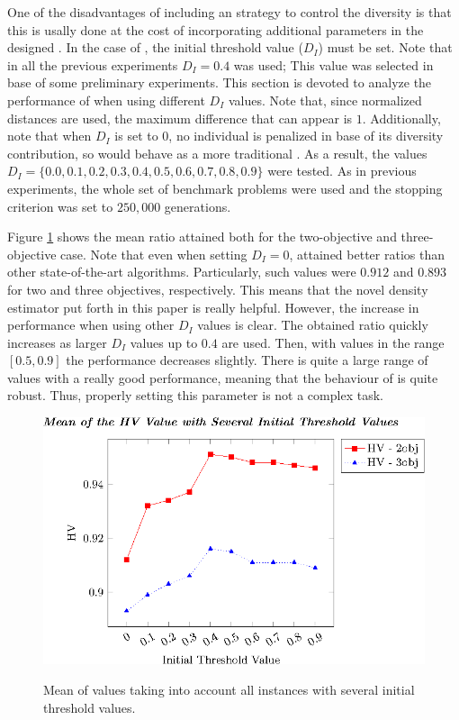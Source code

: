 One of the disadvantages of including an strategy to control the diversity is that this is usally done at the cost of
incorporating additional parameters in the designed \EA{}.
%
In the case of \VSDMOEA{}, the initial threshold value ($D_I$) must be set.
%
Note that in all the previous experiments $D_I = 0.4$ was used;
%
This value was selected in base of some preliminary experiments.
%
This section is devoted to analyze the performance of \VSDMOEA{} when using different $D_I$ values.
%
Note that, since normalized distances are used, the maximum difference that can appear is $1$.
%
Additionally, note that when $D_I$ is set to 0, no individual is penalized in base of its diversity contribution,
so \VSDMOEA{} would behave as a more traditional \MOEA{}.
%
As a result, the values $D_I = \{0.0, 0.1, 0.2, 0.3, 0.4, 0.5, 0.6, 0.7, 0.8, 0.9\}$ were tested.
%
As in previous experiments, the whole set of benchmark problems were used and
the stopping criterion was set to $250,000$ generations.

Figure \ref{fig:Initial-distance-factor} shows the mean \HV{} ratio attained both for the two-objective and three-objective case.
%
Note that even when setting $D_I = 0$, \VSDMOEA{} attained better \HV{} ratios than other state-of-the-art algorithms.
%
Particularly, such values were $0.912$ and $0.893$ for two and three objectives, respectively.
%
This means that the novel density estimator put forth in this paper is really helpful.
%
However, the increase in performance when using other $D_I$ values is clear.
%
The obtained \HV{} ratio quickly increases as larger $D_I$ values up to $0.4$ are used.
%
Then, with values in the range $[0.5, 0.9]$ the performance decreases slightly.
%
There is quite a large range of values with a really good performance, meaning that 
the behaviour of \VSDMOEA{} is quite robust.
%
Thus, properly setting this parameter is not a complex task.
%

\begin{figure}[t]
\centering
\includegraphics[]{Images/Graphic-Initial-Distance_tikz-figure0.eps} \\
%
\caption{Mean of \HV{} values taking into account all instances with several initial threshold values.}\label{fig:Initial-distance-factor}
\end{figure}



%
%
%
%
